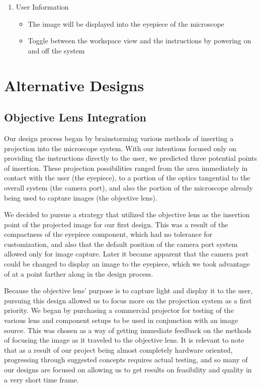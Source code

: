 \documentclass[12pt,a4paper]{article}
\begin{document}
\begin{appendices}
\begin{enumerate}
	\item User Information
		\begin{itemize}
		
			\item The image will be displayed into the eyepiece of the microscope
			\item Toggle between the workspace view and the instructions by powering on and off the system
		\end{itemize}
\end{enumerate}

\pagebreak
\section{Alternative Designs}
\subsection{Objective Lens Integration}
Our design process began by brainstorming various methods of inserting a projection into the microscope system.  With our intentions focused only on providing the instructions directly to the user, we predicted three potential points of insertion.  These projection possibilities ranged from the area immediately in contact with the user (the eyepiece), to a portion of the optics tangential to the overall system (the camera port), and also the portion of the microscope already being used to capture images (the objective lens).

We decided to pursue a strategy that utilized the objective lens as the insertion point of the projected image for our first design.  This was a result of the compactness of the eyepiece component, which had no tolerance for customization, and also that the default position of the camera port system allowed only for image capture.  Later it became apparent that the camera port could be changed to display an image to the eyepiece, which we took advantage of at a point farther along in the design process.
	
Because the objective lens’ purpose is to capture light and display it to the user, pursuing this design allowed us to focus more on the projection system as a first priority.  We began by purchasing a commercial projector for testing of the various lens and component setups to be used in conjunction with an image source.  This was chosen as a way of getting immediate feedback on the methods of focusing the image as it traveled to the objective lens.  It is relevant to note that as a result of our project being almost completely hardware oriented, progressing through suggested concepts requires actual testing, and so many of our designs are focused on allowing us to get results on feasibility and quality in a very short time frame.


\end{appendices}
\end{document}
